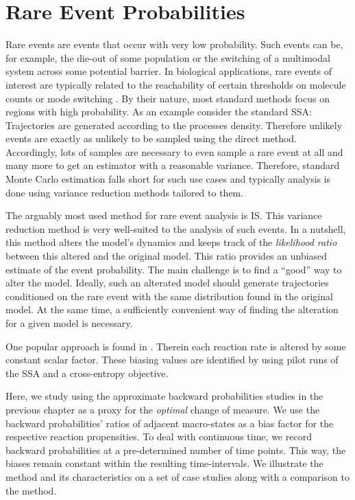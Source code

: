 \chapter{Rare Event Probabilities}\label{ch:is}
Rare events are events that occur with very low probability.
Such events can be, for example, the die-out of some population or the switching of a multimodal system across some potential barrier.
In biological applications, rare events of interest are typically related to the reachability of certain thresholds on molecule counts  or mode switching \parencite{strasser2012stability}.
By their nature, most standard methods focus on regions with high probability.
As an example consider the standard \ac{SSA}:
Trajectories are generated according to the processes density.
Therefore unlikely events are exactly as unlikely to be sampled using the direct method.
Accordingly, lots of samples are necessary to even sample a rare event at all and many more to get an estimator with a reasonable variance.
Therefore, standard Monte Carlo estimation falls short for such use cases and typically analysis is done using variance reduction methods tailored to them.

The arguably most used method for rare event analysis is \acf{IS}.
This variance reduction method is very well-suited to the analysis of such events.
In a nutshell, this method alters the model's dynamics and keeps track of the \emph{likelihood ratio} between this altered and the original model.
This ratio provides an unbiased estimate of the event probability.
The main challenge is to find a ``good'' way to alter the model.
Ideally, such an alterated model should generate trajectories conditioned on the rare event with the same distribution found in the original model.
At the same time, a sufficiently convenient way of finding the alteration for a given model is necessary.

One popular approach is found in  \parencite{kuwahara2008efficient,daigle2011automated}.
Therein each reaction rate is altered by some constant scalar factor.
These biasing values are identified by using pilot runs of the \ac{SSA} and a cross-entropy objective.

Here, we study using the approximate backward probabilities studies in the previous chapter as a proxy for the \emph{optimal} change of measure.
We use the backward probabilities' ratios of adjacent macro-states as a bias factor for the respective reaction propensities.
To deal with continuous time, we record backward probabilities at a pre-determined number of time points.
This way, the biases remain constant within the resulting time-intervals.
We illustrate the method and its characteristics on a set of case studies along with a comparison to the  method.


